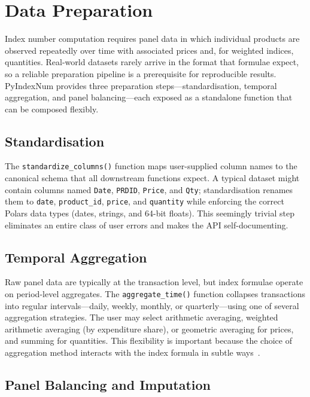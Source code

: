 \documentclass[12pt,a4paper]{article}
\begin{document}
\section{Data Preparation}
\label{sec:preparation}

Index number computation requires panel data in which individual products are observed repeatedly over time with associated prices and, for weighted indices, quantities. Real-world datasets rarely arrive in the format that formulae expect, so a reliable preparation pipeline is a prerequisite for reproducible results. PyIndexNum provides three preparation steps---standardisation, temporal aggregation, and panel balancing---each exposed as a standalone function that can be composed flexibly.

\subsection{Standardisation}

The \texttt{standardize\_columns()} function maps user-supplied column names to the canonical schema that all downstream functions expect. A typical dataset might contain columns named \texttt{Date}, \texttt{PRDID}, \texttt{Price}, and \texttt{Qty}; standardisation renames them to \texttt{date}, \texttt{product\_id}, \texttt{price}, and \texttt{quantity} while enforcing the correct Polars data types (dates, strings, and 64-bit floats). This seemingly trivial step eliminates an entire class of user errors and makes the API self-documenting.

\subsection{Temporal Aggregation}

Raw panel data are typically at the transaction level, but index formulae operate on period-level aggregates. The \texttt{aggregate\_time()} function collapses transactions into regular intervals---daily, weekly, monthly, or quarterly---using one of several aggregation strategies. The user may select arithmetic averaging, weighted arithmetic averaging (by expenditure share), or geometric averaging for prices, and summing for quantities. This flexibility is important because the choice of aggregation method interacts with the index formula in subtle ways~\autocite{iLO2004cpimanual}.

\subsection{Panel Balancing and Imputation}
\end{document}

